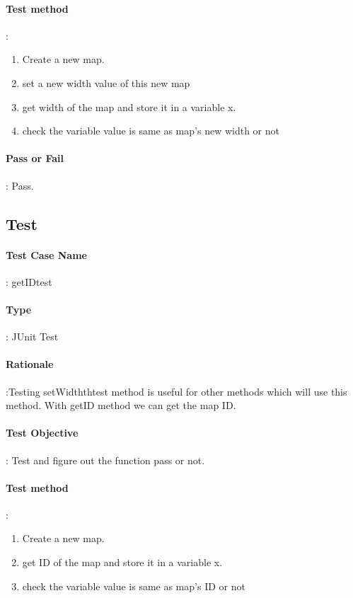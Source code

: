 \documentclass[12pt, a4paper]{report}
\begin{document}
\paragraph{Test method}: 
\begin{enumerate}
	\item Create a new map.
	\item set a new width value of this new map
	\item get width of the map and store it in a variable x.
	\item check the variable value is same as map's new width or not
\end{enumerate}
\paragraph{Pass or Fail}: Pass.


\addtocounter{casecounter}{1}
\subsection{Test }
\paragraph{Test Case Name}: getIDtest
\paragraph{Type}: JUnit Test
\paragraph{Rationale}:Testing setWidththtest method is useful for other methods which will use this method. With getID method we can get the map ID.
\paragraph{Test Objective}: Test and figure out the function pass or not.
\paragraph{Test method}: 
\begin{enumerate}
	\item Create a new map.
	\item get ID of the map and store it in a variable x.
	\item check the variable value is same as map's ID or not
\end{enumerate}
\end{document}
